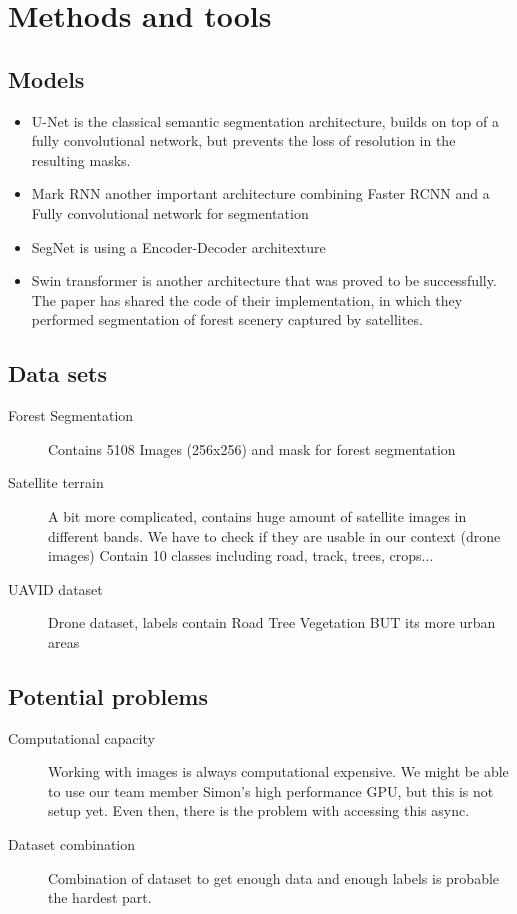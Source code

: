 \documentclass[rnd]{mas_proposal}
\begin{document}
    \section{Methods and tools}

    \subsection{Models}
    \begin{itemize}
        \item U-Net is the classical semantic segmentation architecture, builds on top of a fully convolutional network, but prevents the loss of resolution in the resulting masks.\cite{umar2021forest}
        \item Mark RNN another important architecture combining Faster RCNN and a Fully convolutional network for segmentation \cite{he2018mask}
        \item SegNet is using a Encoder-Decoder architexture \cite{7803544}
        \item Swin transformer is another architecture that was proved to be successfully. The paper \cite{guerin2021satellite} has shared the code of their implementation, in which they performed segmentation of forest scenery captured by satellites.
    \end{itemize}

   
    \subsection{Data sets}
    \begin{description}
        \item[Forest Segmentation] Contains 5108 Images (256x256) and mask for forest segmentation
        \item[Satellite terrain] A bit more complicated, contains huge amount of satellite images in different bands. We have to check if they are usable in our context (drone images) Contain 10 classes including road, track, trees, crops...
        \item[UAVID dataset] Drone dataset, labels contain Road Tree Vegetation BUT its more urban areas
    \end{description}

    \subsection{Potential problems}
    \begin{description}
        \item[Computational capacity] Working with images is always computational expensive. We might be able to use our team member Simon's high performance GPU, but this is not setup yet. Even then, there is the problem with accessing this async.
        \item[Dataset combination] Combination of dataset to get enough data and enough labels is probable the hardest part.
    \end{description}
    
\end{document}
